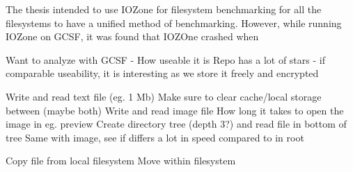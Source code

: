 
The thesis intended to use IOZone for filesystem benchmarking for all the filesystems to have a unified method of benchmarking. However, while running IOZone on GCSF, it was found that IOZOne crashed when  


Want to analyze with GCSF - How useable it is
Repo has a lot of stars - if comparable useability, it is interesting as we store it freely and encrypted

Write and read text file (eg. 1 Mb)
	Make sure to clear cache/local storage between (maybe both)
Write and read image file
	How long it takes to open the image in eg. preview
Create directory tree (depth 3?) and read file in bottom of tree
	Same with image, see if differs a lot in speed compared to in root

Copy file from local filesystem
Move within filesystem 